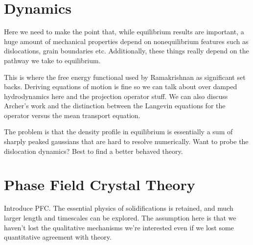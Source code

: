 \section{Dynamics} %

{ \color{ForestGreen} { \bfseries
    
    
    Here we need to make the point that, while equilibrium results are
    important, a huge amount of mechanical properties depend on nonequilibrium
    features such as dislocations, grain boundaries etc. Additionally, these
    things really depend on the pathway we take to equilibrium. 

    This is where the free energy functional used by Ramakrishnan as significant
    set backs. Deriving equations of motion is fine so we can talk about over
    damped hydrodynamics here and the projection operator stuff. We can also
    discuss Archer's work and the distinction between the Langevin equations for
    the operator versus the mean transport equation.

    The problem is that the density profile in equilibrium is essentially a sum
    of sharply peaked gaussians that are hard to resolve numerically. Want to
    probe the dislocation dynamics? Best to find a better behaved theory.} }

\section{Phase Field Crystal Theory} %

{\color{ForestGreen} {\bfseries


    Introduce PFC. The essential physics of solidifications is retained, and
    much larger length and timescales can be explored. The assumption here is
    that we haven't lost the qualitative mechanisms we're interested even if we
    lost some quantitative agreement with theory.}}
